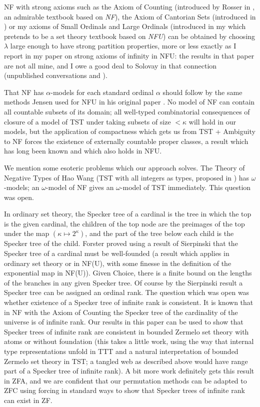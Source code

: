 \documentclass[112pt]{article}
\begin{document}
NF with strong axioms such as the Axiom of Counting (introduced by Rosser in \cite{rosser}, an admirable textbook based on {\em NF\/}), the Axiom of Cantorian Sets (introduced in \cite{henson})  or my axioms of Small Ordinals and Large Ordinals (introduced in  my \cite{mybook} which pretends to be a set theory textbook based on {\em NFU\/}) can be obtained by choosing $\lambda$ large enough to have strong partition properties, more or less exactly as I report in my paper \cite{strongaxioms} on strong axioms of infinity in NFU:  the results in that paper are not all mine, and I owe a good deal to Solovay in that connection (unpublished conversations and \cite{nfub}).

That NF has $\alpha$-models for each standard ordinal $\alpha$ should follow by the same methods Jensen used for NFU in his original paper \cite{nfu}.   No model of NF can contain all countable subsets of its domain;  all well-typed combinatorial consequences
of closure of a model of TST under taking subsets of size $<\kappa$ will hold in our models, but the application of compactness which gets us from TST + Ambiguity to NF forces the existence of externally countable proper classes, a result which has long been known and which also holds in NFU.

We mention some esoteric problems which our approach solves.  The Theory of Negative Types of Hao Wang (TST with all integers as types, proposed in \cite{tnt})  has $\omega$-models;  an $\omega$-model of NF gives an $\omega$-model of TST immediately.  This question was open.

In ordinary set theory, the Specker tree of a cardinal is the tree in which the top is the given cardinal, the children of the top node  are the preimages of the top under the map $(\kappa \mapsto 2^{\kappa})$, and the part of the tree
below each child is the Specker tree of the child.  Forster proved using a result of Sierpinski that the Specker tree of a cardinal must be well-founded (a result which applies in ordinary set theory or in NF(U), with some finesse in the definition of the exponential map in NF(U)).  Given Choice, there is a finite bound on the lengths of the branches in any given Specker tree.  Of course by the Sierpinski result a Specker tree can be assigned an ordinal rank.  The question which was open
was whether existence of a Specker tree of infinite rank is consistent.  It is known that in NF with the Axiom of Counting the Specker tree of the cardinality of the universe is of infinite rank.  Our results in this paper can be used to show that Specker trees of infinite rank are consistent in bounded Zermelo set theory with atoms or without foundation (this takes a little work, using the way that internal type representations unfold in TTT and a natural interpretation of bounded Zermelo set theory in TST;  a tangled web as described above would have range part of a Specker tree of infinite rank).  A bit more work definitely gets this result in ZFA, and we are confident that our permutation methods can be adapted to ZFC using forcing in standard ways to show that Specker trees of infinite rank can exist in ZF.
\end{document}
